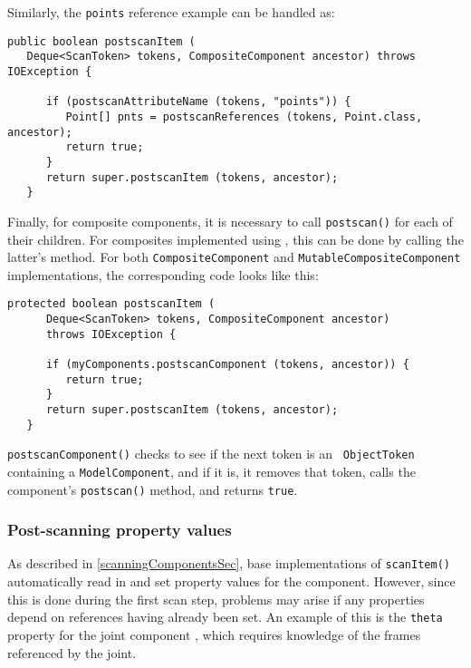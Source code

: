 \documentclass{article}
\begin{document}
Similarly, the {\tt points} reference example can be handled as:
\begin{lstlisting}[]
   public boolean postscanItem (
   Deque<ScanToken> tokens, CompositeComponent ancestor) throws IOException {

      if (postscanAttributeName (tokens, "points")) {
         Point[] pnts = postscanReferences (tokens, Point.class, ancestor);
         return true;
      }
      return super.postscanItem (tokens, ancestor);
   }
\end{lstlisting}

Finally, for composite components, it is necessary to call {\tt postscan()} for
each of their children. For composites implemented using
,
this can be done by calling the latter's
method. For both 
{\tt CompositeComponent} and {\tt MutableCompositeComponent}
implementations, the corresponding code looks like this:
\begin{lstlisting}[]
   protected boolean postscanItem (
      Deque<ScanToken> tokens, CompositeComponent ancestor) 
      throws IOException {
      
      if (myComponents.postscanComponent (tokens, ancestor)) {
         return true;
      }
      return super.postscanItem (tokens, ancestor);
   }
\end{lstlisting}
{\tt postscanComponent()} checks to see if the next token is an {\tt
ObjectToken} containing a {\tt ModelComponent}, and if it is, it
removes that token, calls the component's {\tt postscan()} method, and
returns {\tt true}.

\subsubsection{Post-scanning property values}

As described in \ref{scanningComponentsSec}, base implementations of
{\tt scanItem()} automatically read in and set property values for the
component. However, since this is done during the first scan step,
problems may arise if any properties depend on references having
already been set. An example of this is the {\tt theta} property for
the joint component
, which requires
knowledge of the frames referenced by the joint.
\end{document}
